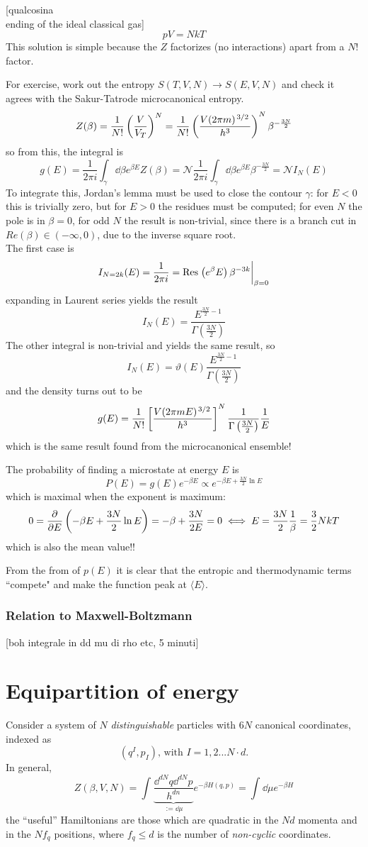 
[qualcosina\\
ending of the ideal classical gas]
$$pV=NkT$$
This solution is simple because the $Z$ factorizes (no interactions) apart from a
$N!$ factor.

For exercise, work out the entropy $S(T,V,N)\to S(E,V,N)$ and check it agrees with
the Sakur-Tatrode microcanonical entropy.
$$Z(\beta) = \frac{1}{N!}\left(\frac{V}{V_T}\right)^N=\frac{1}{N!}\left(
\frac{V(2\pi m)^{\flatfrac{3}{2}}}{h^3}\right)^N
\beta^{-\frac{3N}{2}}$$
so from this, the integral is
$$g(E) = \frac{1}{2\pi i}\int_{\gamma}^{} \dd\beta e^{\beta E}Z(\beta)=
\mathcal{N}\frac{1}{2\pi i}\int_{\gamma}^{} \dd \beta e^{\beta E}\beta^{
-\frac{3N}{2}} = \mathcal{N} I_N(E)
$$
To integrate this, Jordan's lemma must be used to close the contour $\gamma$:
for $E<0$ this is trivially zero, but for $E>0$ the residues
must be computed; for even $N$ the pole is in $\beta=0$, for odd $N$ the
result is non-trivial, since there is a branch cut in $Re(\beta)\in\left(-\infty,0
\right)$, due to the inverse square root.\\
The first case is
$$I_{N=2k}(E)=\frac{1}{2\pi i} = \text{Res}\eval{\left(e^\beta E\right)\beta^{-3k}
}_{\beta=0}$$
expanding in Laurent series yields the result
$$I_{N}(E) = \frac{E^{\frac{3N}{2}-1}}{\Gamma\left(\frac{3N}{2}\right)}$$
The other integral is non-trivial and yields the same result, so
$$I_N(E) = \vartheta(E)\frac{E^{\frac{3N}{2}-1}}{\Gamma\left(\frac{3N}{2}
\right)}$$
and the density turns out to be
$$g(E)=\frac{1}{N!}\left[\frac{V(2\pi mE)^{\flatfrac{3}{2}}}{h^3}\right]^N
\frac{1}{\Gamma\left(\frac{3N}{2}\right)}\frac{1}{E}$$
which is the same result found from the microcanonical ensemble!

The probability of finding a microstate at energy $E$ is
$$P(E) = g(E)e^{-\beta E}\propto e^{-\beta E +\frac{3N}{2}\ln E}$$
which is maximal when the exponent is maximum:
$$0=\pdv[]{}{E}\left(-\beta E + \frac{3N}{2}\ln E\right)=-\beta+\frac{3N}{2E}=0
\iff E = \frac{3N}{2}\frac{1}{\beta} = \frac{3}{2}NkT
$$
which is also the mean value!!

From the from of $p(E)$ it is clear that the entropic and thermodynamic terms
``compete" and make the function peak at $\langle E\rangle$.
\subsubsection{Relation to Maxwell-Boltzmann}
[boh integrale in dd mu di rho etc, 5 minuti]
\section{Equipartition of energy}
Consider a system of $N$ \textit{distinguishable} particles with $6N$ canonical
coordinates, indexed as
$$\left(q^I,p_I\right)\text{, with }I=1,2...N\cdot d.$$
In general,
$$Z(\beta,V,N) = \int_{}^{} \underbrace{\frac{\dd^{dN}q\dd^{dN}p}{h^{dn}}}_{
:=\dd\mu}e^{-\beta H(q,p)}=\int_{}^{} \dd \mu e^{-\beta H}$$
the ``useful'' Hamiltonians are those which are quadratic in the $Nd$ momenta and
in the $Nf_q$ positions, where $f_q\leq d$ is the number of \textit{non-cyclic}
coordinates.


